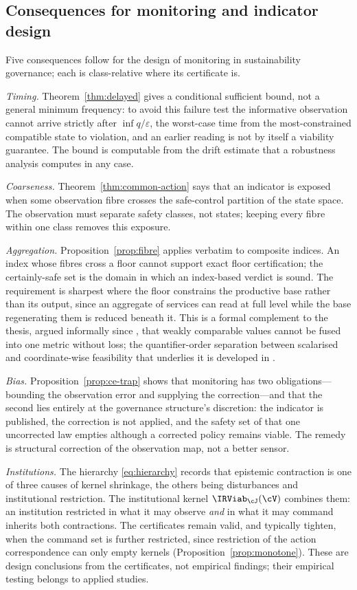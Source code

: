 \subsection{Consequences for monitoring and indicator design}\label{sec:design}

Five consequences follow for the design of monitoring in sustainability governance; each is class-relative where its certificate is.

\emph{Timing.} Theorem~\ref{thm:delayed} gives a conditional sufficient bound, not a general minimum frequency: to avoid this failure test the informative observation cannot arrive strictly after $\inf q/\varepsilon$, the worst-case time from the most-constrained compatible state to violation, and an earlier reading is not by itself a viability guarantee. The bound is computable from the drift estimate that a robustness analysis computes in any case.

\emph{Coarseness.} Theorem~\ref{thm:common-action} says that an indicator is exposed when some observation fibre crosses the safe-control partition of the state space. The observation must separate safety classes, not states; keeping every fibre within one class removes this exposure.

\emph{Aggregation.} Proposition~\ref{prop:fibre} applies verbatim to composite indices. An index whose fibres cross a floor cannot support exact floor certification; the certainly-safe set is the domain in which an index-based verdict is sound. The requirement is sharpest where the floor constrains the productive base rather than its output, since an aggregate of services can read at full level while the base regenerating them is reduced beneath it. This is a formal complement to the thesis, argued informally since \citet{martinezalier1998}, that weakly comparable values cannot be fused into one metric without loss; the quantifier-order separation between scalarised and coordinate-wise feasibility that underlies it is developed in \citet{abaee2026aggregate}.

\emph{Bias.} Proposition~\ref{prop:ce-trap} shows that monitoring has two obligations---bounding the observation error and supplying the correction---and that the second lies entirely at the governance structure's discretion: the indicator is published, the correction is not applied, and the safety set of that one uncorrected law empties although a corrected policy remains viable. The remedy is structural correction of the observation map, not a better sensor.

\emph{Institutions.} The hierarchy \eqref{eq:hierarchy} records that epistemic contraction is one of three causes of kernel shrinkage, the others being disturbances and institutional restriction. The institutional kernel $\IRViab_\cJ(\cV)$ combines them: an institution restricted in what it may observe \emph{and} in what it may command inherits both contractions. The certificates remain valid, and typically tighten, when the command set is further restricted, since restriction of the action correspondence can only empty kernels (Proposition~\ref{prop:monotone}). These are design conclusions from the certificates, not empirical findings; their empirical testing belongs to applied studies.

